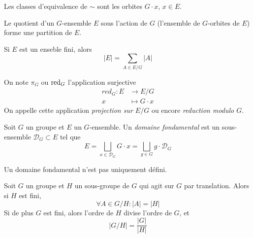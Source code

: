 \begin{remark}
	Les classes d'equivalence de $\sim$ sont les orbites $G \cdot x$, $x \in E$.
\end{remark}

\begin{corollary}
	Le quotient d'un $G$-ensemble $E$ sous l'action de $G$
	(l'ensemble de $G$-orbites de $E$) forme une partition de $E$.
\end{corollary}

\begin{corollary}
	Si $E$ est un enseble fini, alors
	\begin{equation*}
		|E| = \sum_{A \in E/G}|A|
	\end{equation*}
\end{corollary}

\begin{definition}
	On note $\pi_G$ ou $\operatorname{red}_G$ l'application surjective
	\begin{align*}
		red_G : E &\to E/G \\
		x &\mapsto G \cdot x
	\end{align*}
	On appelle cette application \emph{projection sur $E/G$} ou encore
	\emph{reduction modulo $G$}.
\end{definition}

\begin{definition}
	Soit $G$ un groupe et $E$ un $G$-ensemble.
	Un \emph{domaine fondamental} est un sous-ensemble
	$\mathcal{D}_G \subset E$ tel que
	\begin{equation*}
		E = \bigsqcup_{x \in \mathcal{D}_G} G \cdot x
			= \bigsqcup_{g \in G} g \cdot \mathcal{D}_G
	\end{equation*}
\end{definition}

\begin{remark}
	Un domaine fondamental n'est pas uniquement défini.
\end{remark}

\begin{theorem}
	Soit $G$ un groupe et $H$ un sous-groupe de $G$
	qui agit sur $G$ par translation. Alors si $H$ est fini,
	\begin{equation*}
		\forall A \in G/H: |A| = |H|
	\end{equation*}
	Si de plus $G$ est fini, alors l'ordre de $H$ divise l'ordre de $G$,
	et 
	\begin{equation*}
		|G/H| = \frac{|G|}{|H|}
	\end{equation*}
\end{theorem}

